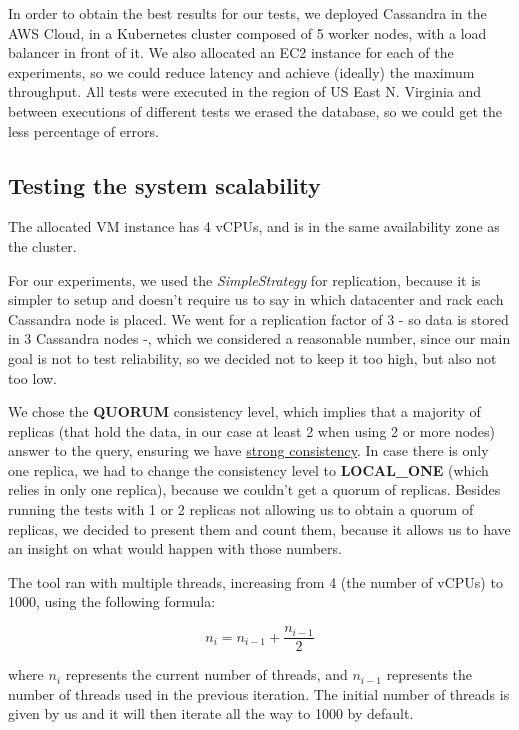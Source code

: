 \documentclass[runningheads]{llncs}
\begin{document}
In order to obtain the best results for our tests, we deployed Cassandra in the AWS Cloud, in a Kubernetes cluster composed of 5 worker nodes, with a load balancer in front of it. We also allocated an EC2 instance for each of the experiments, so we could reduce latency and achieve (ideally) the maximum throughput. All tests were executed in the region of US East N. Virginia and between executions of different tests we erased the database, so we could get the less percentage of errors.

\subsection{Testing the system scalability}

The allocated VM instance has 4 vCPUs, and is in the same availability zone as the cluster.\par

For our experiments, we used the \emph{SimpleStrategy} for replication, because it is simpler to setup and doesn't require us to say in which datacenter and rack each Cassandra node is placed. We went for a replication factor of 3 - so data is stored in 3 Cassandra nodes -, which we considered a reasonable number, since our main goal is not to test reliability, so we decided not to keep it too high, but also not too low.\par

We chose the \textbf{QUORUM} consistency level, which implies that a majority of replicas (that hold the data, in our case at least 2 when using 2 or more nodes) answer to the query, ensuring we have \underline{strong consistency}. In case there is only one replica, we had to change the consistency level to \textbf{LOCAL\_ONE} (which relies in only one replica), because we couldn't get a quorum of replicas. Besides running the tests with 1 or 2 replicas not allowing us to obtain a quorum of replicas, we decided to present them and count them, because it allows us to have an insight on what would happen with those numbers.\par

The tool ran with multiple threads, increasing from 4 (the number of vCPUs) to 1000, using the following formula:

\[ n_i = n_{i-1} + \frac{n_{i-1}}{2} \]

where $n_i$ represents the current number of threads, and $n_{i-1}$ represents the number of threads used in the previous iteration. The initial number of threads is given by us and it will then iterate all the way to 1000 by default.
\end{document}
